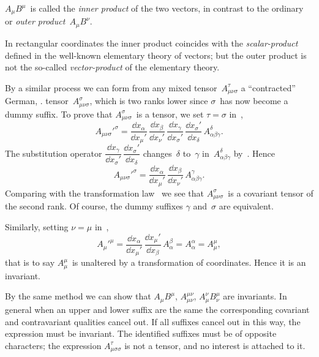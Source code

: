 \documentclass[12pt]{book}
\begin{document}
$A_{\mu}B^{\mu}$~is called the \emph{inner product} of the two vectors, in contrast to the
%
%
%
%
ordinary or \emph{outer product}~$A_{\mu}B^{\nu}$.

In rectangular coordinates the inner product coincides with the \emph{scalar-product}
defined in the well-known elementary theory of vectors; but the outer
product is not the so-called \emph{vector-product} of the elementary theory.

By a similar process we can form from any mixed tensor~$A_{\mu\nu\sigma}^{\tau}$ a ``contracted\footnotemark''\footnotetext
  {German, .}%
tensor~$A_{\mu\nu\sigma}^{\sigma}$, which is two ranks lower since $\sigma$~has now become a
dummy suffix. To prove that $A_{\mu\nu\sigma}^{\sigma}$~is a tensor, we set $\tau = \sigma$ in~,
\[
A_{\mu\nu\sigma}'^{\sigma}
= \frac{\dd x_{\alpha}}{\dd x_{\mu}'}\,
  \frac{\dd x_{\beta}}{\dd x_{\nu}'}\,
  \frac{\dd x_{\gamma}}{\dd x_{\sigma}'}\,
  \frac{\dd x_{\sigma}'}{\dd x_{\delta}}\, A_{\alpha\beta\gamma}^{\delta}.
\]
The substitution operator $\dfrac{\dd x_{\gamma}}{\dd x_{\sigma}'}\, \dfrac{\dd x_{\sigma}'}{\dd x_{\delta}}$ changes~$\delta$ to~$\gamma$ in~$A_{\alpha\beta\gamma}^{\delta}$ by~. Hence
\[
A_{\mu\nu\sigma}'^{\sigma}
= \frac{\dd x_{\alpha}}{\dd x_{\mu}'}\,
  \frac{\dd x_{\beta}}{\dd x_{\nu}'}\, A_{\alpha\beta\gamma}^{\gamma}.
\]
Comparing with the transformation law~ we see that $A_{\mu\nu\sigma}^{\sigma}$~is a covariant
tensor of the second rank. Of course, the dummy suffixes $\gamma$ and~$\sigma$ are equivalent.

Similarly, setting $\nu = \mu$ in~,
\[
A_{\mu}'^{\mu}
= \frac{\dd x_{\alpha}}{\dd x_{\mu}'}\,
  \frac{\dd x_{\mu}'}{\dd x_{\beta}}\, A_{\alpha}^{\beta}
= A_{\alpha}^{\alpha} = A_{\mu}^{\mu},
\]
that is to say $A_{\mu}^{\mu}$~is unaltered by a transformation of coordinates. Hence it
is an invariant.

By the same method we can show that $A_{\mu}B^{\mu}$, $A_{\mu\nu}^{\mu\nu}$, $A_{\mu}^{\nu}B_{\nu}^{\mu}$ are invariants.
In general when an upper and lower suffix are the same the corresponding
covariant and contravariant qualities cancel out. If all suffixes cancel out in
this way, the expression must be invariant. The identified suffixes must be
of opposite characters; the expression $A_{\mu\sigma\sigma}^{\tau}$ is not a tensor, and no interest
is attached to it.
\end{document}
